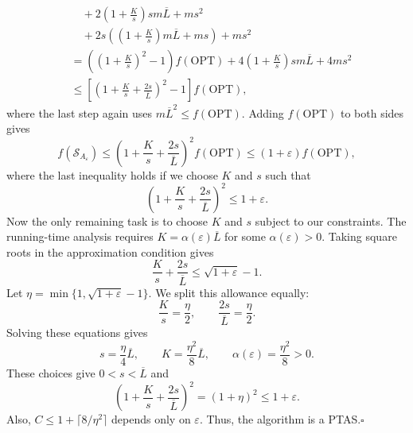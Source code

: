 \documentclass[12pt,a4paper]{article}
\theoremstyle{definition}
\theoremstyle{plain}
\begin{document}
\begin{enumerate}
\[\begin{aligned}
&\quad+2\left(1+\frac{K}{s}\right)sm\overline{L}+ms^2\\
&\quad+2s\left(\left(1+\frac{K}{s}\right)m\overline{L}+ms\right)+ms^2\\
&=\left(\left(1+\frac{K}{s}\right)^2-1\right)f(\mathrm{OPT})
+4\left(1+\frac{K}{s}\right)sm\overline{L}+4ms^2\\
&\leq\left[\left(1+\frac{K}{s}+\frac{2s}{\overline{L}}\right)^2-1\right]
f(\mathrm{OPT}),
\end{aligned}
\]
where the last step again uses $m\overline{L}^2\leq f(\mathrm{OPT})$.
Adding $f(\mathrm{OPT})$ to both sides gives
\[
f(\mathcal{S}_{A_\varepsilon})
\leq\left(1+\frac{K}{s}+\frac{2s}{\overline{L}}\right)^2f(\mathrm{OPT})
\leq(1+\varepsilon)f(\mathrm{OPT}),
\]
where the last inequality holds if we choose $K$ and $s$ such that
\[
\left(1+\frac{K}{s}+\frac{2s}{\overline{L}}\right)^2\leq1+\varepsilon.
\]
Now the only remaining task is to choose $K$ and $s$ subject to our
constraints. The running-time analysis requires
$K=\alpha(\varepsilon)\overline{L}$ for some $\alpha(\varepsilon)>0$.
Taking square roots in the approximation condition gives
\[
\frac{K}{s}+\frac{2s}{\overline{L}}\leq\sqrt{1+\varepsilon}-1.
\]
Let $\eta=\min\{1,\sqrt{1+\varepsilon}-1\}$. We split this allowance equally:
\[
\frac{K}{s}=\frac{\eta}{2},
\qquad \frac{2s}{\overline{L}}=\frac{\eta}{2}.
\]
Solving these equations gives
\[
s=\frac{\eta}{4}\overline{L},
\qquad K=\frac{\eta^2}{8}\overline{L},
\qquad\alpha(\varepsilon)=\frac{\eta^2}{8}>0.
\]
These choices give $0<s<\overline{L}$ and
\[
\left(1+\frac{K}{s}+\frac{2s}{\overline{L}}\right)^2
=(1+\eta)^2\leq1+\varepsilon.
\]
Also, $C\leq1+\lceil8/\eta^2\rceil$ depends only on $\varepsilon$.
Thus, the algorithm is a PTAS.\hfill$\square$
\end{enumerate}
\end{document}
